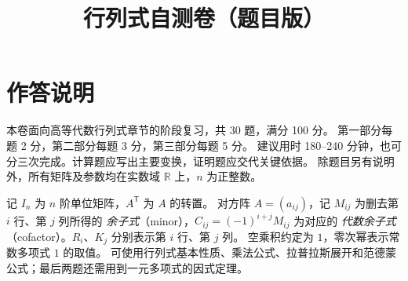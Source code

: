 \documentclass[UTF8,12pt,a4paper,fontset=fandol]{ctexart}
\title{行列式自测卷（题目版）}
\author{}
\date{}
\begin{document}
\maketitle

\section*{作答说明}
本卷面向高等代数行列式章节的阶段复习，共 30 题，满分 100 分。
第一部分每题 2 分，第二部分每题 3 分，第三部分每题 5 分。
建议用时 180--240 分钟，也可分三次完成。计算题应写出主要变换，证明题应交代关键依据。
除题目另有说明外，所有矩阵及参数均在实数域 $\mathbb R$ 上，$n$ 为正整数。

记 $I_n$ 为 $n$ 阶单位矩阵，$A^{\mathsf T}$ 为 $A$ 的转置。
对方阵 $A=(a_{ij})$，记 $M_{ij}$ 为删去第 $i$ 行、第 $j$ 列所得的
\emph{余子式}（minor），$C_{ij}=(-1)^{i+j}M_{ij}$ 为对应的
\emph{代数余子式}（cofactor）。$R_i$、$K_j$ 分别表示第 $i$ 行、第 $j$ 列。
空乘积约定为 $1$，零次幂表示常数多项式 $1$ 的取值。
可使用行列式基本性质、乘法公式、拉普拉斯展开和范德蒙公式；最后两题还需用到一元多项式的因式定理。
\end{document}
